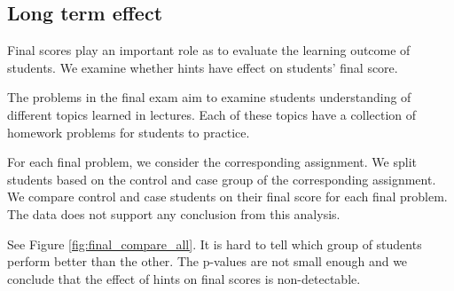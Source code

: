 \documentclass{llncs2e/llncs}
\begin{document}
\subsection{Long term effect}
Final scores play an important role as to evaluate the learning outcome of students. We examine whether hints have effect on students' final score.

The problems in the final exam aim to examine students understanding
of different topics learned in lectures. Each of these topics have a
collection of homework problems for students to practice.

For each final problem, we consider the corresponding assignment. We
split students based on the control and case group of the
corresponding assignment. We compare control and case students on
their final score for each final problem. The data does not support
any conclusion from this analysis.

\iffalse
See Figure \ref{fig:final_compare_all}. It is hard to tell which group of students perform better than the other. The p-values are not small enough and we conclude that the effect of hints on final scores is non-detectable.
\end{document}
